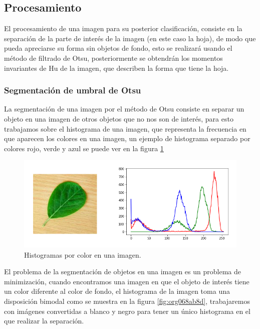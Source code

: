 \documentclass[letter]{article}
\begin{document}
\subsection{Procesamiento}
\label{sec:orgd0b7d6c}
El procesamiento de una imagen para su posterior clasificación, consiste en la
separación de la parte de interés de la imagen (en este caso la hoja), de modo
que pueda apreciarse su forma sin objetos de fondo, esto se realizará usando el
método de filtrado de Otsu, posteriormente se obtendrán los momentos invariantes
de Hu de la imagen, que describen la forma que tiene la hoja.

\subsubsection{Segmentación de umbral de Otsu}
\label{sec:org23adca3}
La segmentación de una imagen por el método de Otsu consiste en separar un
objeto en una imagen de otros objetos que no nos son de interés, para esto
trabajamos sobre el histograma de una imagen, que representa la frecuencia en
que aparecen los colores en una imagen, un ejemplo de histograma separado por
colores rojo, verde y azul se puede ver en la figura \ref{fig:orgbf9205d}

\begin{figure}[htbp]
\centering
\includegraphics[width=.9\linewidth]{./images/histogram1.png}
\caption{\label{fig:orgbf9205d}Histogramas por color en una imagen.}
\end{figure}

El problema de la segmentación de objetos en una imagen es un problema de
minimización, cuando encontramos una imagen en que el objeto de interés tiene un
color diferente al color de fondo, el histograma de la imagen toma una
disposición bimodal como se muestra en la figura \ref{fig:org068ab8d}, trabajaremos con
imágenes convertidas a blanco y negro para tener un único histograma en el que
realizar la separación.
\end{document}
